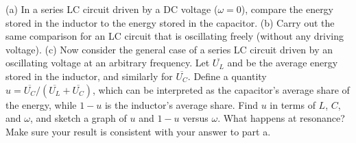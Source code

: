 (a) In a series LC circuit driven by a DC voltage ($\omega=0$), compare the energy stored in
the inductor to the energy stored in the capacitor.\hwendpart
(b) Carry out the same comparison for an LC circuit that is oscillating freely (without any driving voltage).\hwendpart
(c) Now consider the general case of a series LC circuit driven by an oscillating voltage at an arbitrary
frequency. Let $\overline{U_L}$ and be the average energy stored in the inductor, and similarly for $\overline{U_C}$. Define
a quantity $u=\overline{U_C}/(\overline{U_L}+\overline{U_C})$, which can be interpreted as the capacitor's average share of the
energy, while $1-u$ is the inductor's average share. Find $u$ in terms of $L$, $C$, and $\omega$, and sketch
a graph of $u$ and $1-u$ versus $\omega$. What happens at resonance? Make sure your result is consistent with your answer
to part a.\answercheck\hwendpart
